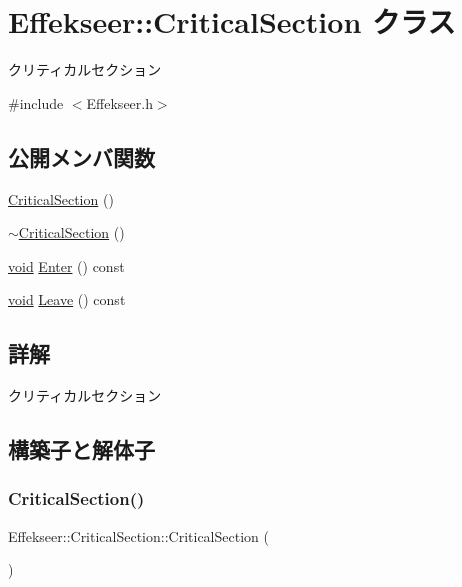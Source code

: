 \hypertarget{class_effekseer_1_1_critical_section}{}\section{Effekseer\+:\+:Critical\+Section クラス}
\label{class_effekseer_1_1_critical_section}


クリティカルセクション  




{\ttfamily \#include $<$Effekseer.\+h$>$}

\subsection*{公開メンバ関数}
\begin{DoxyCompactItemize}
\item 
\mbox{\hyperlink{class_effekseer_1_1_critical_section_af7533c8d9a5b396951abc4ea8bc036a6}{Critical\+Section}} ()
\item 
\mbox{\hyperlink{class_effekseer_1_1_critical_section_a5748b4aa5c32883ae097944dc12466aa}{$\sim$\+Critical\+Section}} ()
\item 
\mbox{\hyperlink{namespace_effekseer_ab34c4088e512200cf4c2716f168deb56}{void}} \mbox{\hyperlink{class_effekseer_1_1_critical_section_a732f99c9be62af56becb34e12194adcf}{Enter}} () const
\item 
\mbox{\hyperlink{namespace_effekseer_ab34c4088e512200cf4c2716f168deb56}{void}} \mbox{\hyperlink{class_effekseer_1_1_critical_section_accefef1ff9d9de4f92269aa005f50007}{Leave}} () const
\end{DoxyCompactItemize}


\subsection{詳解}
クリティカルセクション 

\subsection{構築子と解体子}
\mbox{\label{class_effekseer_1_1_critical_section_af7533c8d9a5b396951abc4ea8bc036a6}} 
\subsubsection{\texorpdfstring{Critical\+Section()}{CriticalSection()}}
{\footnotesize\ttfamily Effekseer\+::\+Critical\+Section\+::\+Critical\+Section (\begin{DoxyParamCaption}{ }\end{DoxyParamCaption})}

